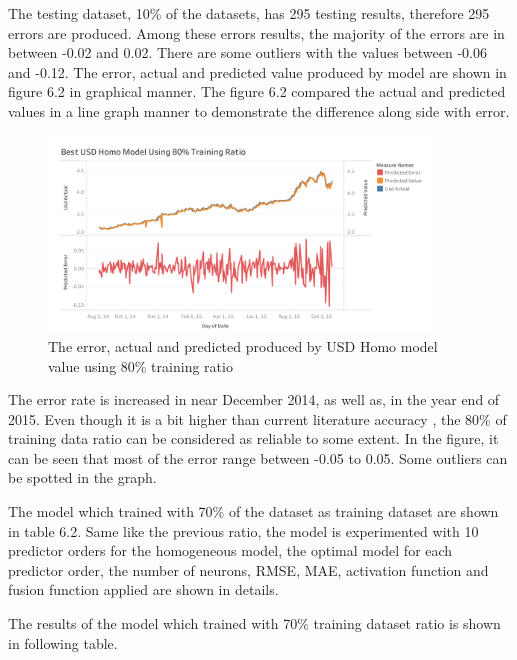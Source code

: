 {The testing dataset, 10\% of the datasets, has 295 testing results, therefore 295 errors are produced. Among these errors results, the majority of the errors are in between -0.02 and 0.02. There are some outliers with the values between -0.06 and -0.12. The error, actual and predicted value produced by model are shown in figure 6.2  in graphical manner. The figure 6.2  compared the actual and predicted values in a line graph manner to demonstrate the difference along side with error.


\begin{figure}[hbt!]\centering
	\includegraphics[width=0.9\textwidth]{best_usd_homo_APV_80}
	\caption{The error, actual and predicted produced by USD Homo model  value using 80\% training ratio }
\end{figure}
\pagebreak


The error rate is increased in near December 2014, as well as, in the year end of 2015. Even though it is a bit higher than current literature accuracy , the 80\% of training data ratio can be considered as reliable to some extent. In the figure, it can be seen that most of the error range between -0.05 to 0.05. Some outliers can be spotted in the graph. 


The model which trained with 70\% of the dataset as training dataset are shown in table 6.2. Same like the previous ratio, the model is  experimented with 10 predictor orders for the homogeneous model, the optimal model for each predictor order, the number of neurons, RMSE, MAE, activation function and fusion function applied are shown in details.


The results of the model which trained with 70\% training dataset ratio is shown in following table.

\setlength{\tabcolsep}{0.5em} %
{\renewcommand{\arraystretch}{1.2}

}}
